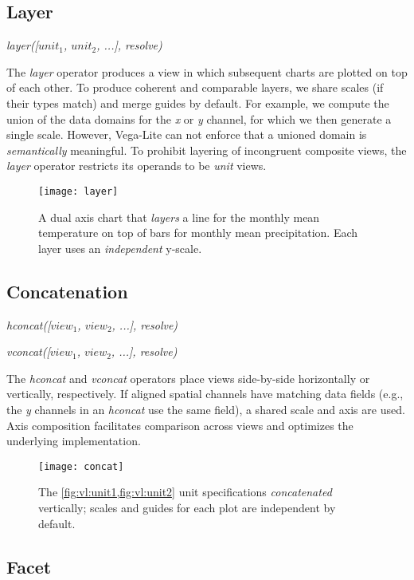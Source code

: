 \newpage
\subsection{Layer}

\centerline{
  \emph{layer([$unit_1$, $unit_2$, ...], resolve)}
}

The \emph{layer} operator produces a view in which subsequent charts are plotted
on top of each other. To produce coherent and comparable layers, we share scales
(if their types match) and merge guides by default. For example, we compute the
union of the data domains for the \emph{x} or \emph{y} channel, for which we
then generate a single scale. However, Vega-Lite can not enforce that a unioned
domain is \emph{semantically} meaningful. To prohibit layering of incongruent
composite views, the \emph{layer} operator restricts its operands to be
\emph{unit} views.

\begin{figure*}[h!]
  \centering
  \texttt{[image: layer]}
  \caption{A dual axis chart that \emph{layers} a line for the monthly mean
  temperature on top of bars for monthly mean precipitation. Each layer uses an
  \emph{independent} y-scale.}
  \label{fig:vl:layer}
\end{figure*}

\subsection{Concatenation}

\centerline{
  \emph{hconcat([$view_1$, $view_2$, ...], resolve)}
}
\centerline{
  \emph{vconcat([$view_1$, $view_2$, ...], resolve)}
}

The \emph{hconcat} and \emph{vconcat} operators place views side-by-side
horizontally or vertically, respectively. If aligned spatial channels have
matching data fields (e.g., the \emph{y} channels in an \emph{hconcat} use the
same field), a shared scale and axis are used. Axis composition facilitates
comparison across views and optimizes the underlying implementation.

\begin{figure*}[h!]
  \centering
  \texttt{[image: concat]}
  \caption{The \cref{fig:vl:unit1,fig:vl:unit2} unit specifications
  \emph{concatenated} vertically; scales and guides for each
  plot are independent by default.}
  \label{fig:vl:concat}
\end{figure*}

\subsection{Facet}

